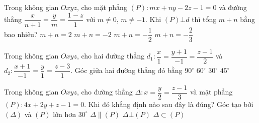 \begin{ex}%
	Trong không gian $Oxyz$, cho mặt phẳng $\left( P \right)\colon mx+ny-2z-1=0$ và đường thẳng $\dfrac{x}{n+1}=\dfrac{y}{m}=\dfrac{1-z}{1}$ với $m\ne 0$, $m\ne -1$. Khi $\left( P \right)\bot d$ thì tổng $m+n$ bằng bao nhiêu?
	\choice
	{$m+n=2$}
	{\True $m+n=-2$}
	{$m+n=-\dfrac{1}{2}$}
	{$m+n=-\dfrac{2}{3}$}
\end{ex}

\begin{ex}%
	Trong không gian $Oxyz$, cho hai đường thẳng $d_1:\dfrac{x}{1}=\dfrac{y+1}{-1}=\dfrac{z-1}{2}$ và $d_2:\dfrac{x+1}{-1}=\dfrac{y}{1}=\dfrac{z-3}{1}$. Góc giữa hai đường thẳng đó bằng
	\choice
	{\True $90^\circ $}
	{$60^\circ $}
	{$30^\circ $}
	{$45^\circ $}
\end{ex}

\begin{ex}%
	Trong không gian $Oxyz$, cho đường thẳng $\Delta \colon x=\dfrac{y}{2}=\dfrac{z-1}{3}$ và mặt phẳng $\left( P \right)\colon4x+2y+z-1=0$. Khi đó khẳng định nào sau đây là đúng?
	\choice
	{\True Góc tạo bởi $\left( \Delta \right)$ và $\left( P \right)$ lớn hơn $30^\circ $}
	{$ \Delta \parallel\left( P \right)$}
	{$ \Delta\bot \left( P \right)$}
	{$ \Delta \subset \left( P \right)$}
\end{ex}

